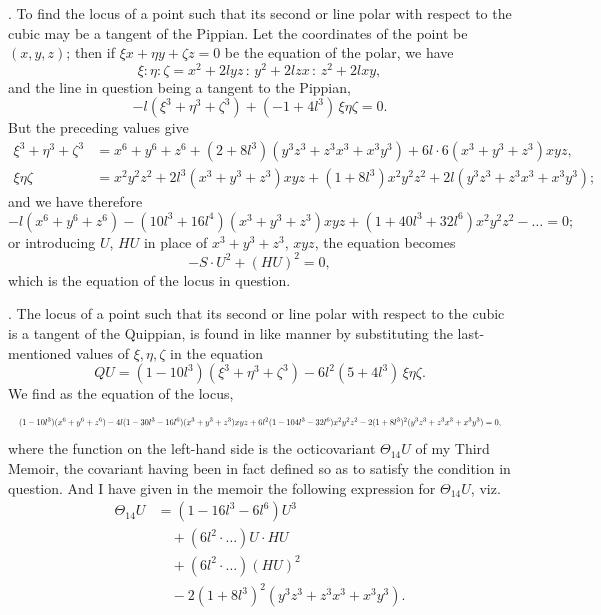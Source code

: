 \documentclass[11pt]{article}
\begin{document}
. To find the locus of a point such that its second or line polar with respect to the cubic may be a tangent of the Pippian. Let the coordinates of the point be $(x, y, z)$; then if $\xi x + \eta y + \zeta z = 0$ be the equation of the polar, we have
\[
\xi : \eta : \zeta = x^2 + 2 l y z \,:\, y^2 + 2 l z x \,:\, z^2 + 2 l x y,
\]
and the line in question being a tangent to the Pippian,
\[
-l(\xi^3 + \eta^3 + \zeta^3) + (-1 + 4 l^3)\,\xi\eta\zeta = 0.
\]
But the preceding values give
\begin{align*}
\xi^3 + \eta^3 + \zeta^3 &= x^6 + y^6 + z^6 + (2 + 8 l^3)(y^3 z^3 + z^3 x^3 + x^3 y^3) + 6 l \cdot 6 (x^3 + y^3 + z^3) x y z, \\
\xi\eta\zeta &= x^2 y^2 z^2 + 2 l^3 (x^3 + y^3 + z^3) x y z + (1 + 8 l^3) x^2 y^2 z^2 + 2 l(y^3 z^3 + z^3 x^3 + x^3 y^3);
\end{align*}
and we have therefore
\[
-l(x^6 + y^6 + z^6) - (10 l^3 + 16 l^4)(x^3 + y^3 + z^3) x y z + (1 + 40 l^3 + 32 l^6) x^2 y^2 z^2 - \ldots = 0;
\]
or introducing $U$, $HU$ in place of $x^3 + y^3 + z^3$, $x y z$, the equation becomes
\[
-S \cdot U^2 + (HU)^2 = 0,
\]
which is the equation of the locus in question.

\medskip

. The locus of a point such that its second or line polar with respect to the cubic is a tangent of the Quippian, is found in like manner by substituting the last-mentioned values of $\xi, \eta, \zeta$ in the equation
\[
QU = (1 - 10 l^3)(\xi^3 + \eta^3 + \zeta^3) - 6 l^2(5 + 4 l^3)\,\xi\eta\zeta.
\]
We find as the equation of the locus,
\[
\resizebox{\textwidth}{!}{$\displaystyle (1 - 10 l^3)(x^6 + y^6 + z^6) - 4 l(1 - 30 l^3 - 16 l^6)(x^3 + y^3 + z^3) x y z + 6 l^2 (1 - 104 l^3 - 32 l^6) x^2 y^2 z^2 - 2(1 + 8 l^3)^2 (y^3 z^3 + z^3 x^3 + x^3 y^3) = 0,$}
\]
where the function on the left-hand side is the octicovariant $\Theta_{14} U$ of my Third Memoir, the covariant having been in fact defined so as to satisfy the condition in question. And I have given in the memoir the following expression for $\Theta_{14} U$, viz.
\begin{align*}
\Theta_{14} U &= (1 - 16 l^3 - 6 l^6) U^3 \\
&\quad + (6 l^2 \cdot\ldots) U \cdot HU \\
&\quad + (6 l^2 \cdot\ldots)(HU)^2 \\
&\quad - 2(1 + 8 l^3)^2 (y^3 z^3 + z^3 x^3 + x^3 y^3).
\end{align*}

\medskip
\end{document}
